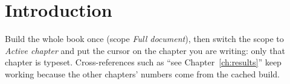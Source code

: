 \chapter{Introduction}\label{ch:intro}
Build the whole book once (scope \emph{Full document}), then switch the scope
to \emph{Active chapter} and put the cursor on the chapter you are writing:
only that chapter is typeset. Cross-references such as ``see
Chapter~\ref{ch:results}'' keep working because the other chapters' numbers
come from the cached build.

\lipsum[1-3]
